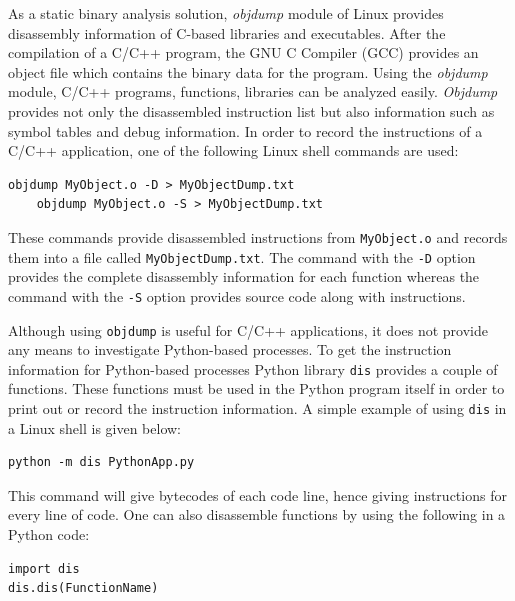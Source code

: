 As a static binary analysis solution, \textit{objdump} \cite{objdump} module of Linux provides disassembly information of C-based libraries and executables. After the compilation of a C/C++ program, the GNU C Compiler (GCC) provides an object file which contains the binary data for the program. Using the \textit{objdump} module, C/C++ programs, functions, libraries can be analyzed easily. \textit{Objdump} provides not only the disassembled instruction list but also information such as symbol tables and debug information. In order to record the instructions of a C/C++ application, one of the following Linux shell commands are used:
\begin{lstlisting}[style=bash]
	objdump MyObject.o -D > MyObjectDump.txt
	objdump MyObject.o -S > MyObjectDump.txt
\end{lstlisting}
These commands provide disassembled instructions from \texttt{MyObject.o} and records them into a file called \texttt{MyObjectDump.txt}. The command with the \texttt{-D} option provides the complete disassembly information for each function whereas the command with the \texttt{-S} option provides source code along with instructions. 

Although using \texttt{objdump} is useful for C/C++ applications, it does not provide any means to investigate Python-based processes. To get the instruction information for Python-based processes Python library \texttt{dis} \cite{dis} provides a couple of functions. These functions must be used in the Python program itself in order to print out or record the instruction information. A simple example of using \texttt{dis} in a Linux shell is given below:
\begin{lstlisting}[style=bash]
python -m dis PythonApp.py
\end{lstlisting}
This command will give bytecodes of each code line, hence giving instructions for every line of code. One can also disassemble functions by using the following in a Python code:
\begin{lstlisting}[style=bash]
import dis
dis.dis(FunctionName)
\end{lstlisting}
 

